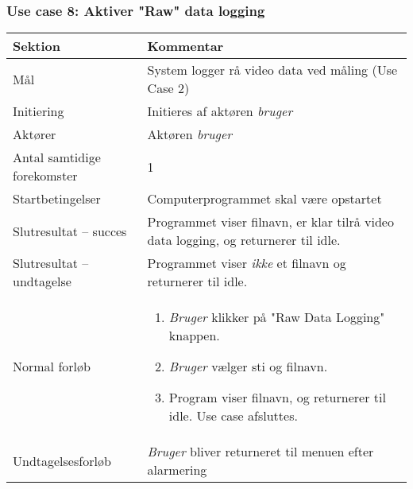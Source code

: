 \documentclass[kravspec.tex]{subfiles}
\begin{document}
	\subsubsection{Use case 8: Aktiver "Raw" data logging}
	\begin{tabular}{|l|p{7.7cm}|}
		\hline \textbf{Sektion} 	& \textbf{Kommentar} \\ 
		\hline Mål  & System logger rå video data ved måling (Use Case 2) \\ 
		\hline Initiering  & Initieres af aktøren \textit{bruger} \\ 
		\hline Aktører & Aktøren \textit{bruger} \\ 
		\hline Antal samtidige forekomster & 1 \\ 
		\hline Startbetingelser & Computerprogrammet skal være opstartet \\ 
		\hline Slutresultat – succes & Programmet viser filnavn, er klar tilrå video data logging, og returnerer til idle. \\ 
		\hline Slutresultat – undtagelse & Programmet viser \textit{ikke} et filnavn og returnerer til idle. \\ 
		\hline Normal forløb & \begin{enumerate}
			\item \textit{Bruger} klikker på "Raw Data Logging" knappen.
			\item \textit{Bruger} vælger sti og filnavn.
			\item Program viser filnavn, og returnerer til idle. Use case afsluttes.
		\end{enumerate} \\ 
		\hline Undtagelsesforløb & \textit{Bruger} bliver returneret til menuen efter alarmering \\ 
		\hline 
	\end{tabular}
	
\end{document}
